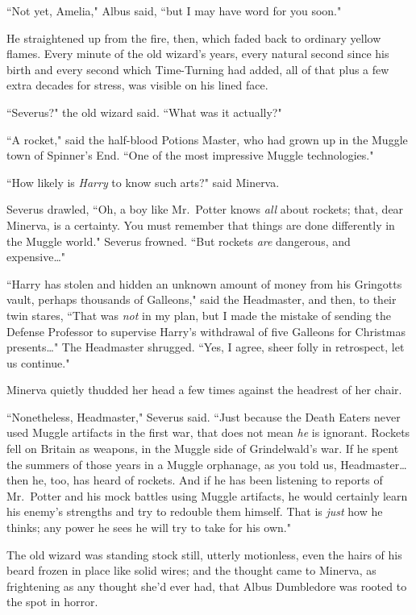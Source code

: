 ``Not yet, Amelia," Albus said, ``but I may have word for you soon."

He straightened up from the fire, then, which faded back to ordinary yellow flames. Every minute of the old wizard's years, every natural second since his birth and every second which Time-Turning had added, all of that plus a few extra decades for stress, was visible on his lined face.

``Severus?" the old wizard said. ``What was it actually?"

``A rocket," said the half-blood Potions Master, who had grown up in the Muggle town of Spinner's End. ``One of the most impressive Muggle technologies."

``How likely is \emph{Harry} to know such arts?" said Minerva.

Severus drawled, ``Oh, a boy like Mr.~Potter knows \emph{all} about rockets; that, dear Minerva, is a certainty. You must remember that things are done differently in the Muggle world." Severus frowned. ``But rockets \emph{are} dangerous, and expensive{\ldots}"

``Harry has stolen and hidden an unknown amount of money from his Gringotts vault, perhaps thousands of Galleons," said the Headmaster, and then, to their twin stares, ``That was \emph{not} in my plan, but I made the mistake of sending the Defense Professor to supervise Harry's withdrawal of five Galleons for Christmas presents{\ldots}" The Headmaster shrugged. ``Yes, I agree, sheer folly in retrospect, let us continue."

Minerva quietly thudded her head a few times against the headrest of her chair.

``Nonetheless, Headmaster," Severus said. ``Just because the Death Eaters never used Muggle artifacts in the first war, that does not mean \emph{he} is ignorant. Rockets fell on Britain as weapons, in the Muggle side of Grindelwald's war. If he spent the summers of those years in a Muggle orphanage, as you told us, Headmaster{\ldots} then he, too, has heard of rockets. And if he has been listening to reports of Mr.~Potter and his mock battles using Muggle artifacts, he would certainly learn his enemy's strengths and try to redouble them himself. That is \emph{just} how he thinks; any power he sees he will try to take for his own."

The old wizard was standing stock still, utterly motionless, even the hairs of his beard frozen in place like solid wires; and the thought came to Minerva, as frightening as any thought she'd ever had, that Albus Dumbledore was rooted to the spot in horror.

